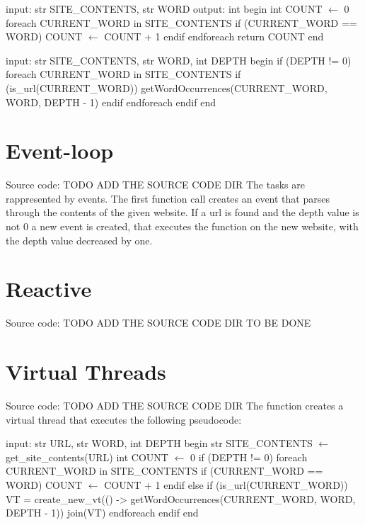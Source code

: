 \documentclass[12pt, a4paper]{report}
\begin{document}
\newpage

\begin{algorithm}[caption={countTask expressed in pseudocode}, label={alg1}]
input: str SITE_CONTENTS, str WORD
output: int
begin
    int COUNT $\gets$ 0
    foreach CURRENT_WORD in SITE_CONTENTS
        if (CURRENT_WORD == WORD)
            COUNT $\gets$ COUNT + 1
        endif
    endforeach
    return COUNT
end       
\end{algorithm}

\begin{algorithm}[caption={linkTask expressed in pseudocode}, label={alg2}]
input: str SITE_CONTENTS, str WORD, int DEPTH
begin
    if (DEPTH != 0)
        foreach CURRENT_WORD in SITE_CONTENTS
            if (is_url(CURRENT_WORD))
                getWordOccurrences(CURRENT_WORD, WORD, DEPTH - 1)
            endif
        endforeach
    endif
end       
\end{algorithm}
\section{Event-loop}
Source code: TODO ADD THE SOURCE CODE DIR
The tasks are rappresented by events. The first function call creates an event that parses through the contents of the given website.
 If a url is found and the depth value is not 0 a new event is created, that executes the function on the new website, with the depth value decreased by one.

\section{Reactive}
Source code: TODO ADD THE SOURCE CODE DIR
TO BE DONE
\section{Virtual Threads}
Source code: TODO ADD THE SOURCE CODE DIR
The function creates a virtual thread that executes the following pseudocode:

\newpage

\begin{algorithm}[label={alg3}]
input: str URL, str WORD, int DEPTH
begin
    str SITE_CONTENTS $\gets$ get_site_contents(URL)
    int COUNT $\gets$ 0
    if (DEPTH != 0)
        foreach CURRENT_WORD in SITE_CONTENTS
            if (CURRENT_WORD == WORD)
                COUNT $\gets$ COUNT + 1
            endif
            else if (is_url(CURRENT_WORD))
                VT = create_new_vt(() -> 
                    getWordOccurrences(CURRENT_WORD, WORD, DEPTH - 1))
                join(VT)
        endforeach
    endif
end       
\end{algorithm}




\end{document}

